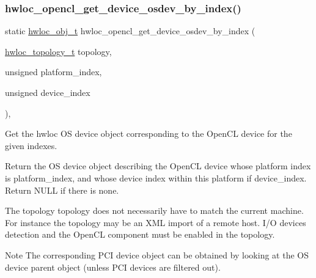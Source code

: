\subsubsection{\texorpdfstring{hwloc\+\_\+opencl\+\_\+get\+\_\+device\+\_\+osdev\+\_\+by\+\_\+index()}{hwloc\_opencl\_get\_device\_osdev\_by\_index()}}
{\footnotesize\ttfamily static \hyperlink{a00185_ga79b8ab56877ef99ac59b833203391c7d}{hwloc\+\_\+obj\+\_\+t} hwloc\+\_\+opencl\+\_\+get\+\_\+device\+\_\+osdev\+\_\+by\+\_\+index (\begin{DoxyParamCaption}\item[{\hyperlink{a00186_ga9d1e76ee15a7dee158b786c30b6a6e38}{hwloc\+\_\+topology\+\_\+t}}]{topology,  }\item[{unsigned}]{platform\+\_\+index,  }\item[{unsigned}]{device\+\_\+index }\end{DoxyParamCaption})\hspace{0.3cm}{\ttfamily [inline]}, {\ttfamily [static]}}



Get the hwloc OS device object corresponding to the Open\+CL device for the given indexes. 

Return the OS device object describing the Open\+CL device whose platform index is {\ttfamily platform\+\_\+index}, and whose device index within this platform if {\ttfamily device\+\_\+index}. Return N\+U\+LL if there is none.

The topology {\ttfamily topology} does not necessarily have to match the current machine. For instance the topology may be an X\+ML import of a remote host. I/O devices detection and the Open\+CL component must be enabled in the topology.

\begin{DoxyNote}{Note}
The corresponding P\+CI device object can be obtained by looking at the OS device parent object (unless P\+CI devices are filtered out). 
\end{DoxyNote}
\mbox{\label{a00218_gab89e4d20f8a353299351b41849e35ac9}} 
